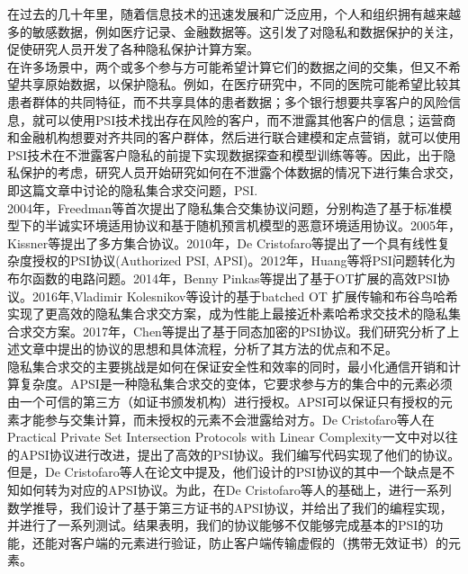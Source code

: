 在过去的几十年里，随着信息技术的迅速发展和广泛应用，个人和组织拥有越来越多的敏感数据，例如医疗记录、金融数据等。这引发了对隐私和数据保护的关注，促使研究人员开发了各种隐私保护计算方案。\\

在许多场景中，两个或多个参与方可能希望计算它们的数据之间的交集，但又不希望共享原始数据，以保护隐私。例如，在医疗研究中，不同的医院可能希望比较其患者群体的共同特征，而不共享具体的患者数据；多个银行想要共享客户的风险信息，就可以使用PSI技术找出存在风险的客户，而不泄露其他客户的信息；运营商和金融机构想要对齐共同的客户群体，然后进行联合建模和定点营销，就可以使用PSI技术在不泄露客户隐私的前提下实现数据探查和模型训练等等。因此，出于隐私保护的考虑，研究人员开始研究如何在不泄露个体数据的情况下进行集合求交，即这篇文章中讨论的隐私集合求交问题，PSI.\\

2004年，Freedman等\cite{freedman2004efficient}首次提出了隐私集合交集协议问题，分别构造了基于标准模型下的半诚实环境适用协议和基于随机预言机模型的恶意环境适用协议。2005年，Kissner等\cite{kissner2005privacy}提出了多方集合协议。2010年，De Cristofaro等\cite{de2010practical}提出了一个具有线性复杂度授权的PSI协议(Authorized PSI, APSI)。2012年，Huang等\cite{huang2012private}将PSI问题转化为布尔函数的电路问题。2014年，Benny Pinkas等\cite{pinkas2014faster}提出了基于OT扩展的高效PSI协议。2016年,Vladimir Kolesnikov等\cite{kolesnikov2016efficient}设计的基于batched OT 扩展传输和布谷鸟哈希实现了更高效的隐私集合求交方案，成为性能上最接近朴素哈希求交技术的隐私集合求交方案。2017年，Chen等\cite{chen2017fast}提出了基于同态加密的PSI协议。我们研究分析了上述文章中提出的协议的思想和具体流程，分析了其方法的优点和不足。\\

隐私集合求交的主要挑战是如何在保证安全性和效率的同时，最小化通信开销和计算复杂度。APSI是一种隐私集合求交的变体，它要求参与方的集合中的元素必须由一个可信的第三方（如证书颁发机构）进行授权。APSI可以保证只有授权的元素才能参与交集计算，而未授权的元素不会泄露给对方。De Cristofaro等人在Practical Private Set Intersection Protocols with Linear Complexity一文\cite{de2010practical}中对以往的APSI协议进行改进，提出了高效的PSI协议。我们编写代码实现了他们的协议。\\

但是，De Cristofaro等人在论文中\cite{de2010practical}提及，他们设计的PSI协议的其中一个缺点是不知如何转为对应的APSI协议。为此，在De Cristofaro等人的基础上，进行一系列数学推导，我们设计了基于第三方证书的APSI协议，并给出了我们的编程实现，并进行了一系列测试。结果表明，我们的协议能够不仅能够完成基本的PSI的功能，还能对客户端的元素进行验证，防止客户端传输虚假的（携带无效证书）的元素。